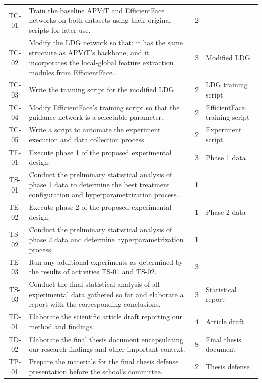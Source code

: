 \begin{center}
\begin{longtable}{cp{}cp{}}
    TC-01 & Train the baseline APViT and EfficientFace networks on both datasets using their original scripts for later use. & 2 &  \\ 
    TC-02 & Modify the LDG network so that: it has the same structure as APViT’s backbone, and it incorporates the local-global feature extraction modules from EfficientFace. & 3 & Modified LDG \\ 
    TC-03 & Write the training script for the modified LDG. & 2 & LDG training script\\ 
    TC-04 & Modify EfficientFace’s training script so that the guidance network is a selectable parameter. & 2 & EfficientFace training script\\ 
    TC-05 & Write a script to automate the experiment execution and data collection process. & 2 & Experiment script \\ 
    TE-01 & Execute phase 1 of the proposed experimental design. & 3 & Phase 1 data \\ 
    TS-01 & Conduct the preliminary statistical analysis of phase 1 data to determine the best treatment configuration and hyperparametrization process. & 1 &  \\ 
    TE-02 & Execute phase 2 of the proposed experimental design. & 1 & Phase 2 data \\ 
    TS-02 & Conduct the preliminary statistical analysis of phase 2 data and determine hyperparametrization process. & 1 &  \\ 
    TE-03 & Run any additional experiments as determined by the results of activities TS-01 and TS-02. & 3 &  \\ 
    TS-03 & Conduct the final statistical analysis of all experimental data gathered so far and elaborate a report with the corresponding conclusions. & 3 & Statistical report \\ 
    TD-01 & Elaborate the scientific article draft reporting our method and findings. & 4 & Article draft \\ 
    TD-02 & Elaborate the final thesis document encapsulating our research findings and other important context. & 8 & Final thesis document \\ 
    TP-01 & Prepare the materials for the final thesis defense presentation before the school’s committee. & 2 & Thesis defense \\ 

\end{longtable}
\end{center}